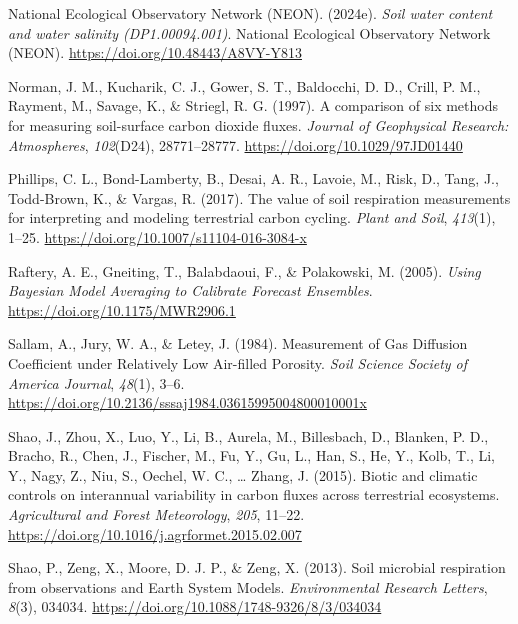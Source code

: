 \documentclass[
  letterpaper,
  DIV=11,
  numbers=noendperiod]{scrartcl}
\newlength{\cslhangindent}
\newenvironment{CSLReferences}[2] %
 {\begin{list}{}{%
  \setlength{\itemindent}{0pt}
  \setlength{\leftmargin}{0pt}
  \setlength{\parsep}{0pt}
  \ifodd #1
   \setlength{\leftmargin}{\cslhangindent}
   \setlength{\itemindent}{-1\cslhangindent}
  \fi
  \setlength{\itemsep}{#2\baselineskip}}}
 {\end{list}}
\begin{document}
\begin{CSLReferences}{1}{0}
National Ecological Observatory Network (NEON). (2024e). \emph{Soil
water content and water salinity ({DP1}.00094.001)}. National Ecological
Observatory Network (NEON). \url{https://doi.org/10.48443/A8VY-Y813}

Norman, J. M., Kucharik, C. J., Gower, S. T., Baldocchi, D. D., Crill,
P. M., Rayment, M., Savage, K., \& Striegl, R. G. (1997). A comparison
of six methods for measuring soil-surface carbon dioxide fluxes.
\emph{Journal of Geophysical Research: Atmospheres}, \emph{102}(D24),
28771--28777. \url{https://doi.org/10.1029/97JD01440}

Phillips, C. L., Bond-Lamberty, B., Desai, A. R., Lavoie, M., Risk, D.,
Tang, J., Todd-Brown, K., \& Vargas, R. (2017). The value of soil
respiration measurements for interpreting and modeling terrestrial
carbon cycling. \emph{Plant and Soil}, \emph{413}(1), 1--25.
\url{https://doi.org/10.1007/s11104-016-3084-x}

Raftery, A. E., Gneiting, T., Balabdaoui, F., \& Polakowski, M. (2005).
\emph{Using {Bayesian Model Averaging} to {Calibrate Forecast
Ensembles}}. \url{https://doi.org/10.1175/MWR2906.1}

Sallam, A., Jury, W. A., \& Letey, J. (1984). Measurement of {Gas
Diffusion Coefficient} under {Relatively Low Air}-filled {Porosity}.
\emph{Soil Science Society of America Journal}, \emph{48}(1), 3--6.
\url{https://doi.org/10.2136/sssaj1984.03615995004800010001x}

Shao, J., Zhou, X., Luo, Y., Li, B., Aurela, M., Billesbach, D.,
Blanken, P. D., Bracho, R., Chen, J., Fischer, M., Fu, Y., Gu, L., Han,
S., He, Y., Kolb, T., Li, Y., Nagy, Z., Niu, S., Oechel, W. C., \ldots{}
Zhang, J. (2015). Biotic and climatic controls on interannual
variability in carbon fluxes across terrestrial ecosystems.
\emph{Agricultural and Forest Meteorology}, \emph{205}, 11--22.
\url{https://doi.org/10.1016/j.agrformet.2015.02.007}

Shao, P., Zeng, X., Moore, D. J. P., \& Zeng, X. (2013). Soil microbial
respiration from observations and {Earth System Models}.
\emph{Environmental Research Letters}, \emph{8}(3), 034034.
\url{https://doi.org/10.1088/1748-9326/8/3/034034}


\end{CSLReferences}
\end{document}
